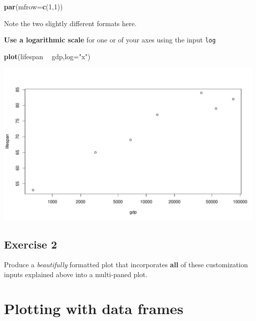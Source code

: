 \documentclass[
]{book}
\newenvironment{Shaded}{\begin{snugshade}}{\end{snugshade}}
\newcommand{\DataTypeTok}[1]{\textcolor[rgb]{0.13,0.29,0.53}{#1}}
\newcommand{\DecValTok}[1]{\textcolor[rgb]{0.00,0.00,0.81}{#1}}
\newcommand{\KeywordTok}[1]{\textcolor[rgb]{0.13,0.29,0.53}{\textbf{#1}}}
\newcommand{\NormalTok}[1]{#1}
\newcommand{\OperatorTok}[1]{\textcolor[rgb]{0.81,0.36,0.00}{\textbf{#1}}}
\newcommand{\StringTok}[1]{\textcolor[rgb]{0.31,0.60,0.02}{#1}}
\begin{document}
\begin{Shaded}
\begin{Highlighting}[]
\KeywordTok{par}\NormalTok{(}\DataTypeTok{mfrow=}\KeywordTok{c}\NormalTok{(}\DecValTok{1}\NormalTok{,}\DecValTok{1}\NormalTok{))}
\end{Highlighting}
\end{Shaded}

Note the two slightly different formats here.

\textbf{Use a logarithmic scale} for one or of your axes using the input \texttt{log}

\begin{Shaded}
\begin{Highlighting}[]
\KeywordTok{plot}\NormalTok{(lifespan }\OperatorTok{~}\StringTok{ }\NormalTok{gdp,}\DataTypeTok{log=}\StringTok{"x"}\NormalTok{)}
\end{Highlighting}
\end{Shaded}

\includegraphics{figures/unnamed-chunk-116-1.pdf}

\hypertarget{exercise-2-3}{%
\subsection*{Exercise 2}\label{exercise-2-3}}

Produce a \emph{beautifully} formatted plot that incorporates \textbf{all} of these customization inputs explained above into a multi-paned plot.

\hypertarget{plotting-with-data-frames}{%
\section*{Plotting with data frames}\label{plotting-with-data-frames}}
\end{document}
